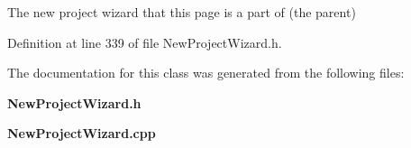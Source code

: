 The new project wizard that this page is a part of (the parent) 



Definition at line 339 of file New\-Project\-Wizard.\-h.



The documentation for this class was generated from the following files\-:\begin{DoxyCompactItemize}
\item 
{\bf New\-Project\-Wizard.\-h}\item 
{\bf New\-Project\-Wizard.\-cpp}\end{DoxyCompactItemize}
